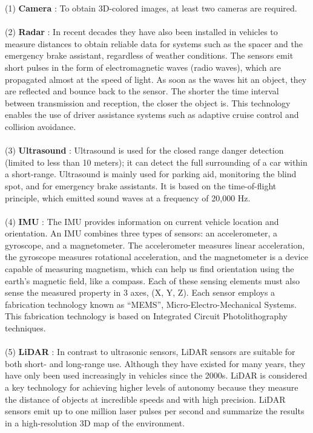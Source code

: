 (1)	\textbf{Camera} \cite{autonomousSensor}: To obtain 3D-colored images, at least two cameras are required.
\\\\
(2)	\textbf{Radar} \cite{autonomousSensor}: In recent decades they have also been installed in vehicles to measure distances to obtain reliable data for systems such as the spacer and the emergency brake assistant, regardless of weather conditions. The sensors emit short pulses in the form of electromagnetic waves (radio waves), which are propagated almost at the speed of light. As soon as the waves hit an object, they are reflected and bounce back to the sensor. The shorter the time interval between transmission and reception, the closer the object is. This technology enables the use of driver assistance systems such as adaptive cruise control and collision avoidance.
\\\\
(3)	\textbf{Ultrasound} \cite{autonomousSensor}: Ultrasound is used for the closed range danger detection (limited to less than 10 meters); it can detect the full surrounding of a car within a short-range. Ultrasound is mainly used for parking aid, monitoring the blind spot, and for emergency brake assistants. It is based on the time-of-flight principle, which emitted sound waves at a frequency of 20,000 Hz.
\\\\
(4)	\textbf{IMU} \cite{ARIMU} \cite{autonomousIMU}: The IMU provides information on current vehicle location and orientation. An IMU combines three types of sensors: an accelerometer, a gyroscope, and a magnetometer. The accelerometer measures linear acceleration, the gyroscope measures rotational acceleration, and the magnetometer is a device capable of measuring magnetism, which can help us find orientation using the earth's magnetic field, like a compass. Each of these sensing elements must also sense the measured property in 3 axes, (X, Y, Z). Each sensor employs a fabrication technology known as “MEMS”, Micro-Electro-Mechanical Systems. This fabrication technology is based on Integrated Circuit Photolithography techniques.
\\\\
(5)	\textbf{LiDAR} \cite{autonomousSensor}: In contrast to ultrasonic sensors, LiDAR sensors are suitable for both short- and long-range use. Although they have existed for many years, they have only been used increasingly in vehicles since the 2000s. LiDAR is considered a key technology for achieving higher levels of autonomy because they measure the distance of objects at incredible speeds and with high precision. LiDAR sensors emit up to one million laser pulses per second and summarize the results in a high-resolution 3D map of the environment.
